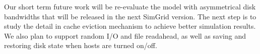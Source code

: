 \documentclass[conference]{IEEEtran}
\begin{document}
			Our short term future work will be re-evaluate the model with asymmetrical 
			disk bandwidths that will be released in the next SimGrid version.
			The next step is to study the detail in cache eviction mechanism to achieve 
			better simulation results. 
			We also plan to support random I/O and file readahead, as well as 
			saving and restoring disk state when hosts are turned on/off.	 



\end{document}
